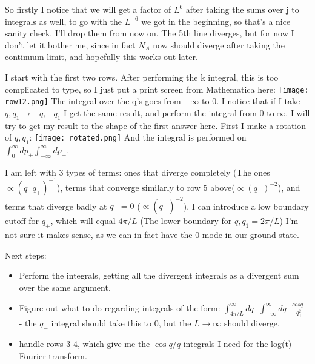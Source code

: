 \documentclass[a4paper]{article}
\begin{document}
So firstly I notice that we will get a factor of $L^6$ after taking the sums over j to integrals as well, to go with the $L^{-6}$ we got in the beginning, so that's a nice sanity check. I'll drop them from now on. The 5th line diverges, but for now I don't let it bother me, since in fact $N_A$ now should diverge after taking the continuum limit, and hopefully this works out later.

I start with the first two rows. After performing the k integral, this is too complicated to type, so I just put a print screen from Mathematica here:\newline
\texttt{[image: row12.png]} \newline
The integral over the q's goes from $-\infty$ to 0. I notice that if I take $q, q_1 \rightarrow -q, -q_1$ I get the same result, and perform the integral from 0 to $\infty$. I will try to get my result to the shape of the first answer  \href{https://math.stackexchange.com/questions/2340049/calculate-the-fourier-transform-of-log-x}{here}.\newline
First I make a rotation of $q, q_1$:\newline
\texttt{[image: rotated.png]} \newline
And the integral is performed on $\int_{0}^{\infty}dp_+ \int_{-\infty}^{\infty}dp_-$.\newline

I am left with 3 types of terms: ones that diverge completely (The ones $\propto (q_- q_+)^{-1}$), terms that converge similarly to row 5 above($\propto (q_-)^{-2}$), and terms that diverge badly at $q_+ = 0$ ($\propto (q_+)^{-2}$). I can introduce a low boundary cutoff for $q_+$, which will equal $4\pi/L$ (The lower boundary for $q, q_1 = 2\pi/L$) I'm not sure it makes sense, as we can in fact have the 0 mode in our ground state.

Next steps:
\begin{itemize}
	\item Perform the integrals, getting all the divergent integrals as a divergent sum over the same argument.
	\item Figure out what to do regarding integrals of the form: $\int_{4\pi/L}^\infty dq_+ \int_{-\infty}^{\infty} dq_- \frac{cos{q_-}}{q_+^2}$ - the $q_-$ integral should take this to 0, but the $L\rightarrow\infty$ should diverge.
	\item handle rows 3-4, which give me the $\cos{q}/q$ integrals I need for the log(t) Fourier transform.
\end{itemize}
\end{document}
